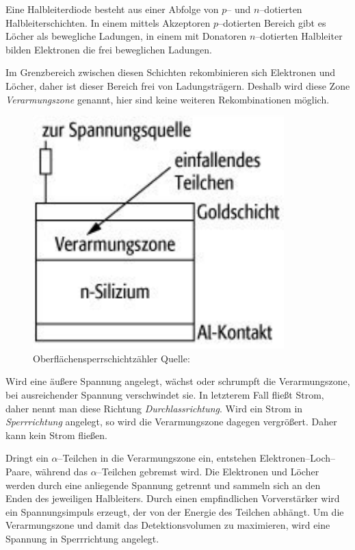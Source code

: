 \documentclass[12pt,a4paper]{scrartcl}
\numberwithin{equation}{section} %
\begin{document}
Eine Halbleiterdiode besteht aus einer Abfolge von $p$-- und $n$--dotierten Halbleiterschichten. In einem mittels Akzeptoren $p$--dotierten Bereich gibt es Löcher als bewegliche Ladungen, in einem mit Donatoren $n$--dotierten Halbleiter bilden Elektronen die frei beweglichen Ladungen.

Im Grenzbereich zwischen diesen Schichten rekombinieren sich Elektronen und Löcher, daher ist dieser Bereich frei von Ladungsträgern. Deshalb wird diese Zone \emph{Verarmungszone} genannt, hier sind keine weiteren Rekombinationen möglich.

\begin{figure}[h!]
	\centering
	\includegraphics{../media/B3.3/Oberflaechensperrschichtzaehler.pdf}
	\caption{Oberflächensperrschichtzähler Quelle: \cite{SpektrumOberfl.Zähler}}
\end{figure}

\noindent
Wird eine äußere Spannung angelegt, wächst oder schrumpft die Verarmungszone, bei ausreichender Spannung verschwindet sie. In letzterem Fall fließt Strom, daher nennt man diese Richtung \emph{Durchlassrichtung}. Wird ein Strom in \emph{Sperrrichtung} angelegt, so wird die Verarmungszone dagegen vergrößert. Daher kann kein Strom fließen.

Dringt ein $\alpha$--Teilchen in die Verarmungszone ein, entstehen Elektronen--Loch--Paare, während das $\alpha$--Teilchen gebremst wird. Die Elektronen und Löcher werden durch eine anliegende Spannung getrennt und sammeln sich an den Enden des jeweiligen Halbleiters. Durch einen empfindlichen Vorverstärker wird ein Spannungsimpuls erzeugt, der von der Energie des Teilchen abhängt. Um die Verarmungszone und damit das Detektionsvolumen zu maximieren, wird eine Spannung in Sperrrichtung angelegt.
\end{document}
